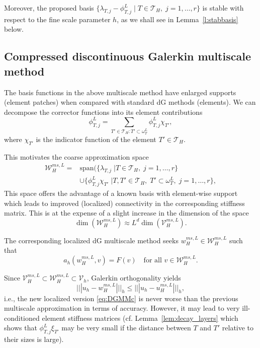 \documentclass[10pt]{article}
\numberwithin{equation}{section}
\theoremstyle{plain}
\theoremstyle{definition}
\theoremstyle{remark}
\begin{document}
Moreover, the proposed basis $\{\lambda_{T,j}-\phi^L_{T,j}\;\vert\; T\in{\mathcal{T}}_H,\;j=1,\ldots,r\}$ is stable with respect to the fine scale parameter $h$, as we shall see in Lemma~\ref{l:stabbasis} below.

\subsection{Compressed discontinuous Galerkin multiscale method}\label{ss:compressed}
The basis functions in the above multiscale method have enlarged supports (element patches) when compared with standard dG methods (elements). We can decompose the corrector functions into its element contributions
\begin{equation*}
 \phi^L_{T,j}=\sum_{T'\in{\mathcal{T}}_H:T'\subset\omega_T^L} \phi^L_{T,j}\chi_{T'},
\end{equation*}
where $\chi_{T'}$ is the indicator function of the element $T'\in{\mathcal{T}}_H$. 

This motivates the coarse approximation space
\begin{align*}
 {\mathcal{W}^{ms,L}_{H}}=&\text{span}\bigl(\{\lambda_{T,j}\;\vert T\in{\mathcal{T}}_H,\;j=1,\ldots,r\}\\&\cup
\{\phi^L_{T,j}\chi_{T'}\;\vert T,T'\in{\mathcal{T}}_H,\;T'\subset\omega_T^L,\;j=1,\ldots,r\},
\end{align*}
This space offers the advantage of a known basis with element-wise support which leads to improved (localized) connectivity in the corresponding stiffness matrix. This is at the expense of a slight increase in the dimension of the space
$${\operatorname*{dim}({\mathcal{W}^{ms,L}_{H}})} \approx L^d{\operatorname*{dim}({\mathcal{V}^{ms,L}_{H}})}.$$

The corresponding localized dG multiscale method seeks ${w^{ms,L}_{H}}\in{\mathcal{W}^{ms,L}_{H}}$ such that
\begin{equation}\label{eq:DGMMc}
  {a_h({w^{ms,L}_{H}},{v})} = F(v)\quad \text{for all }v\in{\mathcal{W}^{ms,L}_{H}}.
\end{equation}

Since ${\mathcal{V}^{ms,L}_{H}}\subset{\mathcal{W}^{ms,L}_{H}}\subset {\mathcal{V}_h}$, Galerkin orthogonality yields
\begin{equation}\label{e:DGMMcbest}
{||| {u_h-{w^{ms,L}_{H}}} |||_h}\leq{||| {u_h-{u^{ms,L}_{H}}} |||_h},
\end{equation}
i.e., the new localized version \eqref{eq:DGMMc} is never worse than the previous multiscale approximation in terms of accuracy. However, it may lead to very ill-conditioned element stiffness matrices (cf. Lemma~\ref{lem:decay_layers} which shows that $\phi^L_{T,j}\xi_{T'}$ may be very small if the distance between $T$ and $T'$ relative to their sizes is large). 
\end{document}
